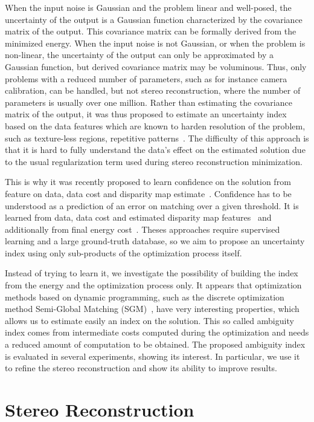\documentclass{article}
\begin{document}
When the input noise is Gaussian and the problem linear and well-posed, the uncertainty of the output is a Gaussian function characterized by the covariance matrix of the output. This covariance matrix can be formally derived from the minimized energy. When the input noise is not Gaussian, or when the problem is non-linear, the uncertainty of the output can only be approximated by a Gaussian function, but derived covariance matrix may be voluminous. Thus, only problems with a reduced number of parameters, such as for instance camera calibration, can be handled, but not stereo reconstruction, where the number of parameters is usually over one million. Rather than estimating the covariance matrix of the output, it was thus proposed to estimate an uncertainty index based on the data features which are known to harden resolution of the problem, such as texture-less regions, repetitive patterns~\cite{hu12}. The difficulty of this approach is that it is hard to fully understand the data's effect on the estimated solution due to the usual regularization term used during stereo reconstruction minimization.

This is why it was recently proposed to learn confidence on the solution from feature on data, data cost and disparity map estimate~\cite{haeusler13, spyropoulos14, park15, seki16}. Confidence has to be understood as a prediction of an error on matching over a given threshold. It is learned from data, data cost and estimated disparity map features~\cite{spyropoulos14, park15, seki16} and additionally from final energy cost~\cite{haeusler13}. Theses approaches require supervised learning and a large ground-truth database, so we aim to propose an uncertainty index using only sub-products of the optimization process itself.

Instead of trying to learn it, we investigate the possibility of building the index from the energy and the optimization process only. It appears that optimization methods based on dynamic programming, such as the discrete optimization method Semi-Global Matching (SGM)~\cite{hirschmuller08}, have very interesting properties, which allows us to estimate easily an index on the solution. This so called ambiguity index comes from intermediate costs computed during the optimization and needs a reduced amount of computation to be obtained. The proposed ambiguity index is evaluated in several experiments, showing its interest. In particular, we use it to refine the stereo reconstruction and show its ability to improve results.

\section{Stereo Reconstruction}
\label{sec:index}
\end{document}
